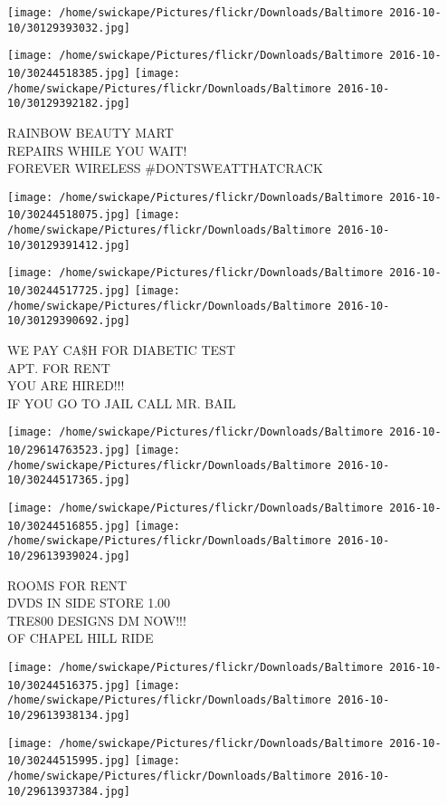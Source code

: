 \documentclass[10pt,letterpaper]{article}
\begin{document}
\texttt{[image: /home/swickape/Pictures/flickr/Downloads/Baltimore 2016-10-10/30129393032.jpg]}

\vspace{0.25in}
\texttt{[image: /home/swickape/Pictures/flickr/Downloads/Baltimore 2016-10-10/30244518385.jpg]}
\texttt{[image: /home/swickape/Pictures/flickr/Downloads/Baltimore 2016-10-10/30129392182.jpg]}

RAINBOW BEAUTY MART\\
REPAIRS WHILE YOU WAIT!\\
FOREVER WIRELESS \#DONTSWEATTHATCRACK
\pagebreak

\texttt{[image: /home/swickape/Pictures/flickr/Downloads/Baltimore 2016-10-10/30244518075.jpg]}
\texttt{[image: /home/swickape/Pictures/flickr/Downloads/Baltimore 2016-10-10/30129391412.jpg]}

\texttt{[image: /home/swickape/Pictures/flickr/Downloads/Baltimore 2016-10-10/30244517725.jpg]}
\texttt{[image: /home/swickape/Pictures/flickr/Downloads/Baltimore 2016-10-10/30129390692.jpg]}

WE PAY CA\$H FOR DIABETIC TEST\\
APT. FOR RENT\\
YOU ARE HIRED!!!\\
IF YOU GO TO JAIL CALL MR. BAIL
\pagebreak

\texttt{[image: /home/swickape/Pictures/flickr/Downloads/Baltimore 2016-10-10/29614763523.jpg]}
\texttt{[image: /home/swickape/Pictures/flickr/Downloads/Baltimore 2016-10-10/30244517365.jpg]}

\texttt{[image: /home/swickape/Pictures/flickr/Downloads/Baltimore 2016-10-10/30244516855.jpg]}
\texttt{[image: /home/swickape/Pictures/flickr/Downloads/Baltimore 2016-10-10/29613939024.jpg]}

ROOMS FOR RENT\\
DVDS IN SIDE STORE 1.00\\
TRE800 DESIGNS DM NOW!!!\\
OF CHAPEL HILL RIDE
\pagebreak

\texttt{[image: /home/swickape/Pictures/flickr/Downloads/Baltimore 2016-10-10/30244516375.jpg]}
\texttt{[image: /home/swickape/Pictures/flickr/Downloads/Baltimore 2016-10-10/29613938134.jpg]}

\texttt{[image: /home/swickape/Pictures/flickr/Downloads/Baltimore 2016-10-10/30244515995.jpg]}
\texttt{[image: /home/swickape/Pictures/flickr/Downloads/Baltimore 2016-10-10/29613937384.jpg]}
\end{document}
